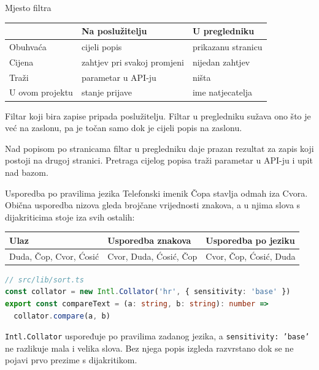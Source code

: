 \begin{frame}{Mjesto filtra}
\vspace{0.3em}
\begin{center}
{\small
\setlength{\tabcolsep}{6pt}
\renewcommand{\arraystretch}{1.35}
\begin{tabular}{@{}L{2.8cm}L{4.6cm}L{4.2cm}@{}}
  \toprule
   & \textbf{Na poslužitelju} & \textbf{U pregledniku} \\
  \midrule
  Obuhvaća & cijeli popis & prikazanu stranicu \\
  Cijena & zahtjev pri svakoj promjeni & nijedan zahtjev \\
  Traži & parametar u API-ju & ništa \\
  U ovom projektu & stanje prijave & ime natjecatelja \\
  \bottomrule
\end{tabular}
}
\end{center}

\vspace{0.6em}
Filtar koji bira zapise pripada poslužitelju. Filtar u pregledniku sužava ono što je već na zaslonu, pa je točan samo dok je cijeli popis na zaslonu.

\vspace{0.4em}
Nad popisom po stranicama filtar u pregledniku daje prazan rezultat za zapis koji postoji na drugoj stranici. Pretraga cijelog popisa traži parametar u API-ju i upit nad bazom.
\end{frame}

\begin{frame}[fragile]{Usporedba po pravilima jezika}
Telefonski imenik Čopa stavlja odmah iza Cvora. Obična usporedba nizova gleda brojčane vrijednosti znakova, a u njima slova s dijakriticima stoje iza svih ostalih:

\vspace{0.4em}
\begin{center}
{\small
\setlength{\tabcolsep}{6pt}
\renewcommand{\arraystretch}{1.3}
\begin{tabular}{@{}L{3.6cm}L{3.6cm}L{3.6cm}@{}}
  \toprule
  \textbf{Ulaz} & \textbf{Usporedba znakova} & \textbf{Usporedba po jeziku} \\
  \midrule
  Duda, Čop, Cvor, Ćosić & Cvor, Duda, Ćosić, Čop & Cvor, Čop, Ćosić, Duda \\
  \bottomrule
\end{tabular}
}
\end{center}

\begin{lstlisting}[language=typescript]
// src/lib/sort.ts
const collator = new Intl.Collator('hr', { sensitivity: 'base' })
export const compareText = (a: string, b: string): number =>
  collator.compare(a, b)
\end{lstlisting}

\vspace{0.1em}
\texttt{Intl.Collator} uspoređuje po pravilima zadanog jezika, a \texttt{sensitivity: 'base'} ne razlikuje mala i velika slova. Bez njega popis izgleda razvrstano dok se ne pojavi prvo prezime s dijakritikom.
\end{frame}

